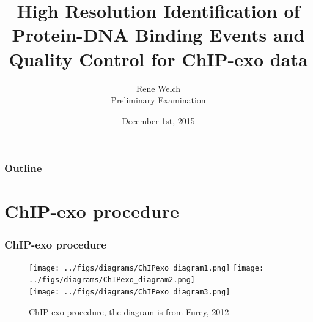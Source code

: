 \documentclass[compress,table,xcolor=dvipsnames]{beamer}\usepackage[]{graphicx}\usepackage[]{color}
\title[High Resolution Identification of Protein-DNA Binding Events]{High Resolution Identification of Protein-DNA Binding Events
  and Quality Control for ChIP-exo data}
\author{Rene Welch\\Preliminary Examination}
\institute[UW-STAT]{Department of Statistics\\University of Wisconsin - Madison}
\date{December 1st, 2015}
\begin{document}
\begin{frame}
  \maketitle
\end{frame}

\begin{frame}
\frametitle{Outline}
  \tableofcontents
\end{frame}

\section{ChIP-exo procedure}

\begin{frame}
\frametitle{ChIP-exo procedure}
  \begin{figure}[H]
    \centering
\texttt{[image: ../figs/diagrams/ChIPexo\_diagram1.png]}
\texttt{[image: ../figs/diagrams/ChIPexo\_diagram2.png]}\\
\texttt{[image: ../figs/diagrams/ChIPexo\_diagram3.png]}
    \caption{ChIP-exo procedure, the diagram is from Furey, 2012 \cite{chipbeyond}}
    \label{fig:exo_diagram}
  \end{figure}
\end{frame}
\end{document}
